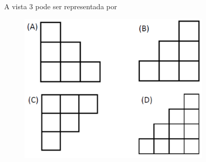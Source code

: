 A vista $3$ pode ser representada por

\begin{figure}[H]
\includegraphics[width=3.59198in,height=2.82524in]{./imgSAEB_6_MAT/media/image113.png}
\end{figure}



%



